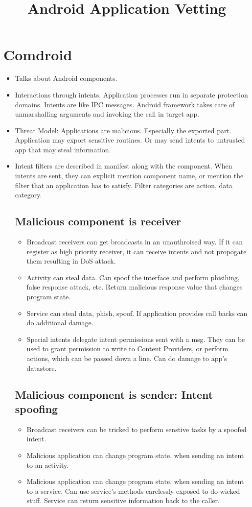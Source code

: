 \documentclass[11pt]{article} %
\title{Android Application Vetting}
\begin{document}
\maketitle
\section {Comdroid}
\begin {itemize} \itemsep -2pt
\item Talks about Android components.
\item Interactions through intents. Application processes run in separate
protection domains. Intents are like IPC messages. Android framework takes
care of unmarshalling arguments and invoking the call in target app.
\item Threat Model: Applications are malicious. Especially the exported part.
Application may export sensitive routines. Or may send intents to untrusted app
that may steal information. 
\item Intent filters are described in manifest along with the component. When
intents are sent, they can explicit mention component name, or mention the
filter that an application has to satisfy. Filter categories are action, data
category.
\subsection {Malicious component is receiver}
\begin {itemize} \itemsep -2pt
\item Broadcast receivers can get broadcasts in an unauthroised way. If it can
register as high priority receiver, it can receive intents and not propogate them
resulting in DoS attack.
\item Activity can steal data. Can spoof the interface and perform phisihing, false
response attack, etc. Return malicious response value that changes program state.
\item Service can steal data, phish, spoof. If application provides call backs
can do additional damage.
\item Special intents delegate intent permissions sent with a msg. They can be
used to grant permission to write to Content Providers, or perform actions, which
can be passed down a line. Can do damage to app's datastore.
\end {itemize}
\subsection {Malicious component is sender: Intent spoofing}
\begin {itemize} \itemsep -2pt
\item Broadcast receivers can be tricked to perform senstive tasks by a spoofed
intent.
\item Malicious application can change program state, when sending an intent to
an activity.
\item Malicious application can change program state, when sending an intent to
a service. Can use service's methods carelessly exposed to do wicked stuff. Service
can return sensitive information back to the caller.
\end {itemize}
\end {itemize}
\end{document}
